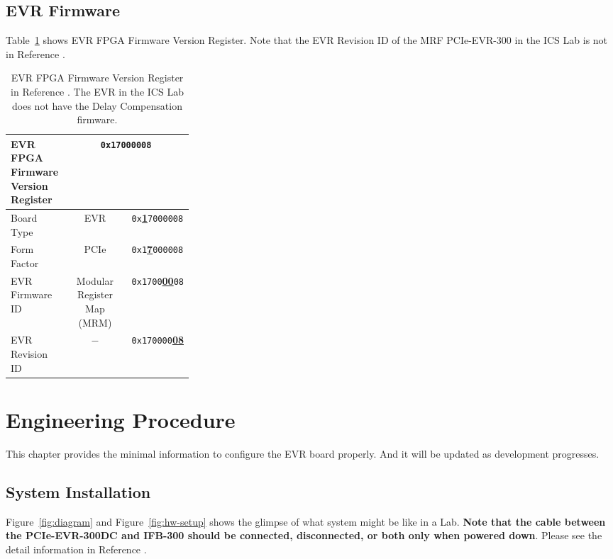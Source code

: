 \documentclass[11pt
  , a4paper
  , article
  , oneside
  , showtrims
]{memoir}
\begin{document}
\section{EVR Firmware}
Table~\ref{table:fwinfo} shows EVR FPGA Firmware Version Register. Note that the EVR Revision ID of the MRF PCIe-EVR-300 in the ICS Lab is not in Reference \cite{MRFEVENTSYSTEMDC}.

\begin{table}[!htb]
  \centering
  \begin{tabular}{p{0.3\linewidth}|c|l}
    \toprule
    EVR FPGA Firmware Version Register            & \multicolumn{2}{c}{\texttt{0x17000008}}             \\\midrule
    Board Type      & EVR                         &  \texttt{0x}\underline{\textbf{1}}\texttt{7000008}  \\\midrule
    Form Factor     & PCIe                        &  \texttt{0x1}\underline{\textbf{7}}\texttt{000008}  \\\midrule
    EVR Firmware ID & Modular Register Map (MRM)  &  \texttt{0x1700}\underline{\textbf{00}}\texttt{08}  \\\midrule
    EVR Revision ID & $-$                         &  \texttt{0x170000}\underline{\textbf{08}}           \\\bottomrule
  \end{tabular}
  \caption[]{EVR FPGA Firmware Version Register in Reference \citep[see][p66]{MRFEVENTSYSTEMDC}. The EVR in the ICS Lab does not have the Delay Compensation firmware.}
  \label{table:fwinfo}
\end{table}


\clearpage
\chapter{Engineering Procedure}
This chapter provides the minimal information to configure the EVR board properly. And it will be updated as development progresses. 

\section{System Installation}
Figure~\ref{fig:diagram} and Figure~\ref{fig:hw-setup} shows the glimpse of what system might be like in a Lab. \textbf{Note that the cable between the PCIe-EVR-300DC and IFB-300 should be connected, disconnected, or both only when powered down}. Please see the detail information in Reference \citep[][p54]{MRFEVENTSYSTEMDC}.
  
\end{document}
